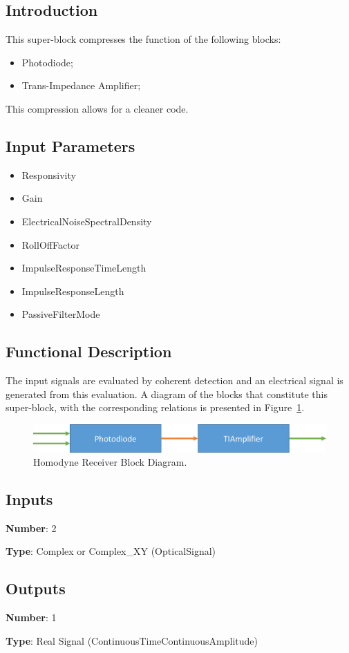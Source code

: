 \documentclass[../../sdf/tex/BPSK_system.tex]{subfiles}
\date{}
\begin{document}
\onlyinsubfile{\maketitle}

\subsection*{Introduction}

This super-block compresses the function of the following blocks:
\begin{itemize}
\item Photodiode;
\item Trans-Impedance Amplifier;
\end{itemize}
\noindent
This compression allows for a cleaner code.

\subsection*{Input Parameters}

\begin{itemize}
	\item Responsivity
	\item Gain
	\item ElectricalNoiseSpectralDensity
	\item RollOffFactor
	\item ImpulseResponseTimeLength
	\item ImpulseResponseLength
	\item PassiveFilterMode
\end{itemize}

\subsection*{Functional Description}

The input signals are evaluated by coherent detection and an electrical signal is generated from this evaluation. A diagram of the blocks that constitute this super-block, with the corresponding relations is presented in Figure~\ref{fig:physicalsystem}.

\begin{figure}[H]
\centering
\includegraphics[width=\linewidth]{./lib/figures/blockdiagram_receiver.png}
\caption{Homodyne Receiver Block Diagram.}
\label{fig:physicalsystem}
\end{figure}

\subsection*{Inputs}

\textbf{Number}: 2

\textbf{Type}: Complex or Complex\_XY (OpticalSignal)

\subsection*{Outputs}

\textbf{Number}: 1

\textbf{Type}: Real Signal (ContinuousTimeContinuousAmplitude)
\end{document}
